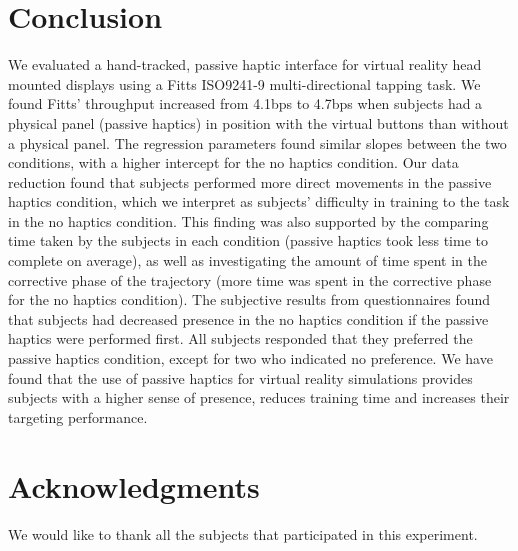 \documentclass[]{aiaa-tc}%
\begin{document}
\section{Conclusion}

We evaluated a hand-tracked, passive haptic interface for virtual reality head mounted displays using a Fitts ISO9241-9 multi-directional tapping task.
We found Fitts' throughput increased from 4.1bps to 4.7bps when subjects had a physical panel (passive haptics) in position with the virtual buttons than without a physical panel.
The regression parameters found similar slopes between the two conditions, with a higher intercept for the no haptics condition.
Our data reduction found that subjects performed more direct movements in the passive haptics condition, which we interpret as subjects' difficulty in training to the task in the no haptics condition.
This finding was also supported by the comparing time taken by the subjects in each condition (passive haptics took less time to complete on average), as well as investigating the amount of time spent in the corrective phase of the trajectory (more time was spent in the corrective phase for the no haptics condition).
The subjective results from questionnaires found that subjects had decreased presence in the no haptics condition if the passive haptics were performed first.
All subjects responded that they preferred the passive haptics condition, except for two who indicated no preference.
We have found that the use of passive haptics for virtual reality simulations provides subjects with a higher sense of presence, reduces training time and increases their targeting performance.


\section*{Acknowledgments}
We would like to thank all the subjects that participated in this experiment.




\end{document}
